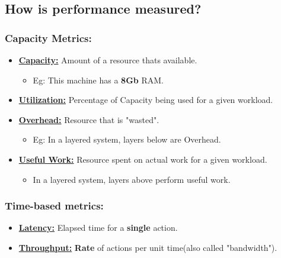 \documentclass{article}
\begin{document}
\subsection*{How is performance measured?}

\subsubsection*{Capacity Metrics:}
\begin{itemize}
    \item \underline{\textbf{Capacity:}} Amount of a resource thats available.
    \begin{itemize}
        \item Eg: This machine has a \textbf{8Gb} RAM.
    \end{itemize}
    \item \underline{\textbf{Utilization:}} Percentage of Capacity being used for a given workload.
    \item \underline{\textbf{Overhead:}} Resource that is "wasted".
    \begin{itemize}
        \item Eg: In a layered system, layers below are Overhead.
    \end{itemize}
    \item \underline{\textbf{Useful Work:}} Resource spent on actual work for a given workload.
    \begin{itemize}
        \item In a layered system, layers above perform useful work.
    \end{itemize}
\end{itemize}

\subsubsection*{Time-based metrics:}
\begin{itemize}
    \item \underline{\textbf{Latency:}} Elapsed time for a \textbf{single} action.
    \item \underline{\textbf{Throughput:}} \textbf{Rate} of actions per unit time(also called "bandwidth"). 
\end{itemize}
\end{document}
